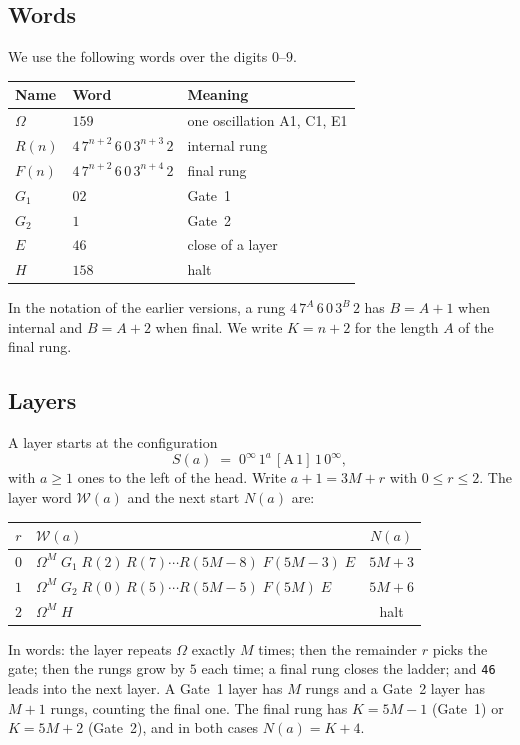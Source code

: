 \documentclass[11pt]{article}
\theoremstyle{definition}
\theoremstyle{remark}
\newcommand{\hd}[2]{[\mathrm{#1}\,#2]}
\newcommand{\Z}{0^{\infty}}
\newcommand{\W}{\mathcal{W}}
\begin{document}
\subsection{Words}

We use the following words over the digits $0$--$9$.
\begin{center}
\begin{tabular}{lll}
\toprule
Name & Word & Meaning\\
\midrule
$\Omega$ & $159$ & one oscillation A1, C1, E1\\
$R(n)$ & $4\,7^{n+2}\,6\,0\,3^{n+3}\,2$ & internal rung\\
$F(n)$ & $4\,7^{n+2}\,6\,0\,3^{n+4}\,2$ & final rung\\
$G_1$ & $02$ & Gate~1\\
$G_2$ & $1$ & Gate~2\\
$E$ & $46$ & close of a layer\\
$H$ & $158$ & halt\\
\bottomrule
\end{tabular}
\end{center}
In the notation of the earlier versions, a rung $4\,7^{A}\,6\,0\,3^{B}\,2$ has $B=A+1$
when internal and $B=A+2$ when final. We write $K=n+2$ for the length $A$ of the final
rung.

\subsection{Layers}

A layer starts at the configuration
\[
S(a) \;=\; \Z\,1^{a}\,\hd{A}{1}\,1\,\Z ,
\]
with $a\ge 1$ ones to the left of the head. Write $a+1 = 3M + r$ with $0\le r\le 2$.
The layer word $\W(a)$ and the next start $N(a)$ are:
\begin{center}
\renewcommand{\arraystretch}{1.3}
\begin{tabular}{clc}
\toprule
$r$ & $\W(a)$ & $N(a)$\\
\midrule
$0$ & $\Omega^{M}\; G_1\; R(2)\,R(7)\cdots R(5M-8)\; F(5M-3)\; E$ & $5M+3$\\
$1$ & $\Omega^{M}\; G_2\; R(0)\,R(5)\cdots R(5M-5)\; F(5M)\; E$ & $5M+6$\\
$2$ & $\Omega^{M}\; H$ & halt\\
\bottomrule
\end{tabular}
\end{center}
In words: the layer repeats $\Omega$ exactly $M$ times; then the remainder $r$ picks
the gate; then the rungs grow by $5$ each time; a final rung closes the ladder; and
\texttt{46} leads into the next layer. A Gate~1 layer has $M$ rungs and a Gate~2 layer
has $M+1$ rungs, counting the final one. The final rung has
$K = 5M-1$ (Gate~1) or $K = 5M+2$ (Gate~2), and in both cases $N(a) = K+4$.
\end{document}

